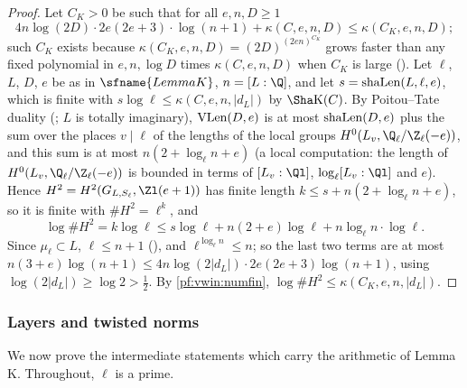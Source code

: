 \begin{proof}
Let $C_K>0$ be such that for all $e,n,D\ge1$
\begin{equation}\label{pf:vwin:numfin}
 4n\log(2D)\cdot2e(2e+3)\cdot\log(n+1)+\kappa(C,e,n,D)\le\kappa(C_K,e,n,D);
\end{equation}
such $C_K$ exists because $\kappa(C_K,e,n,D)=(2D)^{(2en)^{C_K}}$ grows faster than any fixed polynomial in $e,n,\log D$ times $\kappa(C,e,n,D)$
when $C_K$ is large (). Let $\ell$, $L$, $D$, $e$ be as in $\sfname{LemmaK}$, $n=[L:\Q]$, and let $s=\mathrm{shaLen}(L,\ell,e)$,
which is finite with $s\log\ell\le\kappa(C,e,n,|d_L|)$ by $\Sha\mathrm{K}(C)$. By Poitou--Tate duality (;
$L$ is totally imaginary), $\mathrm{VLen}(D,e)$ is at most $\mathrm{shaLen}(D,e)$ plus the sum over the places $v\mid\ell$ of the lengths of the local groups
$H^0(L_v,\vwinQZ(-e))$, and this sum is at most $n(2+\log_\ell n+e)$ (a local computation: the length of $H^0(L_v,\vwinQZ(-e))$ is bounded in terms of
$[L_v:\Ql]$, $\log_\ell[L_v:\Ql]$ and $e$). Hence $H^2=H^2(G_{L,S_\ell},\Zl(e+1))$ has finite length $k\le s+n(2+\log_\ell n+e)$, so it is finite
with $\#H^2=\ell^k$, and
\[
 \log\#H^2=k\log\ell\le s\log\ell+n(2+e)\log\ell+n\log_\ell n\cdot\log\ell .
\]
Since $\mu_\ell\subset L$, $\ell\le n+1$ (), and $\ell^{\log_\ell n}\le n$; so the last two terms are at most
$n(3+e)\log(n+1)\le4n\log(2|d_L|)\cdot2e(2e+3)\log(n+1)$, using $\log(2|d_L|)\ge\log2>\frac12$. By \eqref{pf:vwin:numfin},
$\log\#H^2\le\kappa(C_K,e,n,|d_L|)$.
\end{proof}


\subsubsection{Layers and twisted norms}

We now prove the intermediate statements which carry the arithmetic of Lemma K. Throughout, $\ell$ is a prime.

